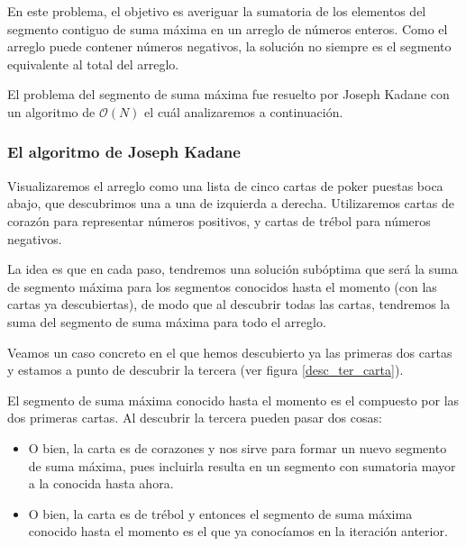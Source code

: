 \documentclass[12pt, a4paper, openany, fleqn]{book}
\newif\ifUsePstPoker
\begin{document}
    En este problema, el objetivo es averiguar la sumatoria de los elementos del segmento contiguo de suma máxima en un arreglo de números enteros.
    Como el arreglo puede contener números negativos, la solución no siempre es el segmento equivalente al total del arreglo.

    El problema del segmento de suma máxima fue resuelto por Joseph Kadane con un algoritmo de $\mathcal{O}(N)$ el cuál analizaremos a continuación.

    \subsubsection*{El algoritmo de Joseph Kadane}
    Visualizaremos el arreglo como una lista de cinco cartas de poker puestas boca abajo, que descubrimos una a una de izquierda a derecha. Utilizaremos cartas de corazón para representar números positivos, y cartas de trébol para números negativos.

    La idea es que en cada paso, tendremos una solución subóptima que será la suma de segmento máxima para los segmentos conocidos hasta el momento (con las cartas ya descubiertas), de modo que al descubrir todas las cartas, tendremos la suma del segmento de suma máxima para todo el arreglo.

    Veamos un caso concreto en el que hemos descubierto ya las primeras dos cartas y estamos a punto de descubrir la tercera (ver figura \ref{desc_ter_carta}).

    \ifUsePstPoker
        \begin{figure}[h]
            \centering
            \psset{framebg=beige}\crdsevh
            \psset{framebg=beige}\crdtwoh
            \psset{backcolor=red}\crdback
            \psset{backcolor=red}\crdback
            \psset{backcolor=red}\crdback
            \rput(-8.2,-1){\textbf{\^}} %

            \caption{Descubriendo la tercera carta} \label{desc_ter_carta}
        \end{figure}
    \fi

    El segmento de suma máxima conocido hasta el momento es el compuesto por las dos primeras cartas. Al descubrir la tercera pueden pasar dos cosas:
    \begin{itemize}
        \item O bien, la carta es de corazones y nos sirve para formar un nuevo segmento de suma máxima, pues incluirla resulta en un segmento con sumatoria mayor a la conocida hasta ahora.
        \item O bien, la carta es de trébol y entonces el segmento de suma máxima conocido hasta el momento es el que ya conocíamos en la iteración anterior.
    \end{itemize}
\end{document}
